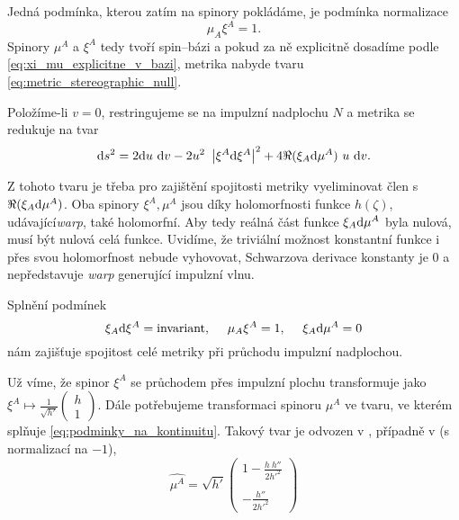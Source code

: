 Jedná podmínka, kterou zatím na spinory pokládáme, je podmínka normalizace
\begin{equation}
    \mu_A \xi^A = 1.
\end{equation}
Spinory $\mu^A$ a $\xi^A$ tedy tvoří spin--bázi a pokud za ně explicitně dosadíme podle
\eqref{eq:xi_mu_explicitne_v_bazi}, metrika nabyde tvaru \eqref{eq:metric_stereographic_null}.

Položíme-li $v=0$, restringujeme se na impulzní nadplochu $N$ a metrika se redukuje na tvar
\begin{equation}
    \mathrm{d} s^2 = 2 \mathrm{d} u ~\mathrm{d} v - 2 u^2 ~\left| \xi^A \mathrm{d} \xi^A \right|^2 + 4 \Re(\xi_A \mathrm{d} \mu^A) ~u~ \mathrm{d} v.
\end{equation}

Z tohoto tvaru je třeba pro zajištění spojitosti metriky vyeliminovat člen s $\Re(\xi_A \mathrm{d} \mu^A)$. Oba spinory
$\xi^A, \mu^A$ jsou díky holomorfnosti funkce $h(\zeta)$, udávající\emph{warp}, také holomorfní. Aby tedy reálná část
funkce $\xi_A \mathrm{d} \mu^A$ byla nulová, musí být nulová celá funkce. Uvidíme, že triviální možnost konstantní funkce i přes svou holomorfnost
nebude vyhovovat, Schwarzova derivace konstanty je 0 a nepředstavuje \emph{warp} generující impulzní vlnu.

Splnění podmínek 
\begin{equation}
    \label{eq:podminky_na_kontinuitu}
    \xi_A \mathrm{d} \xi^A = \text{invariant}, ~~~~ \mu_A \xi^A = 1,~~~~ \xi_A \mathrm{d} \mu^A = 0
\end{equation}
nám zajišťuje spojitost celé metriky při průchodu impulzní nadplochou.

Už víme, že spinor $\xi^A$ se průchodem přes impulzní plochu transformuje jako $\xi^A \mapsto \frac{1}{\sqrt{h'}} \begin{pmatrix}
    h \\ 1
\end{pmatrix}$. Dále potřebujeme transformaci spinoru $\mu^A$ ve tvaru, ve kterém splňuje \eqref{eq:podminky_na_kontinuitu}.
Takový tvar je odvozen v \cite{scholtz_notes}, případně v \cite{Aliev2001} (s normalizací na $-1$),
\begin{equation}
    \label{eq:mu_transformace}
    \hat{\mu^A} = \sqrt{h'} \begin{pmatrix}
        1 - \frac{h ~h''}{2 h'^2} \\ ~ \\ - \frac{h''}{2 h'^2}
    \end{pmatrix}
\end{equation}

